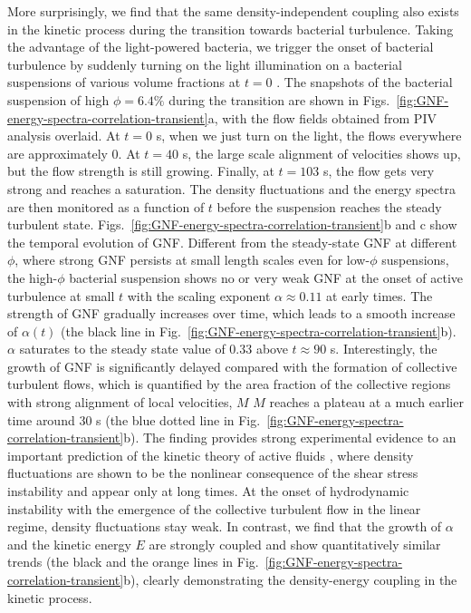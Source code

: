 \documentclass[twocolumn,aps,prx,amsmath,amssymb,longbibliography]{revtex4-2}
\begin{document}
More surprisingly, we find that the same density-independent coupling also exists in the kinetic process during the transition towards bacterial turbulence. Taking the advantage of the light-powered bacteria, we trigger the onset of bacterial turbulence by suddenly turning on the light illumination on a bacterial suspensions of various volume fractions at $t=0$ \cite{Peng2020}.
The snapshots of the bacterial suspension of high $\phi = 6.4\%$ during the transition are shown in Figs.~\ref{fig:GNF-energy-spectra-correlation-transient}a, with the flow fields obtained from PIV analysis overlaid. At $t=0$ s, when we just turn on the light, the flows everywhere are approximately 0. At $t=40$ s, the large scale alignment of velocities shows up, but the flow strength is still growing. Finally, at $t=103$ s, the flow gets very strong and reaches a saturation.
The density fluctuations and the energy spectra are then monitored as a function of $t$ before the suspension reaches the steady turbulent state. Figs.~\ref{fig:GNF-energy-spectra-correlation-transient}b and c show the temporal evolution of GNF. Different from the steady-state GNF at different $\phi$, where strong GNF persists at small length scales even for low-$\phi$ suspensions, the high-$\phi$ bacterial suspension shows no or very weak GNF at the onset of active turbulence at small $t$ with the scaling exponent $\alpha \approx 0.11$ at early times. The strength of GNF gradually increases over time, which leads to a smooth increase of $\alpha(t)$ (the black line in Fig.~\ref{fig:GNF-energy-spectra-correlation-transient}b). $\alpha$ saturates to the steady state value of 0.33 above $t \approx 90$ s. Interestingly, the growth of GNF is significantly delayed compared with the formation of collective turbulent flows, which is quantified by the area fraction of the collective regions with strong alignment of local velocities, $M$ \cite{Cisneros2011, Peng2020, Liu2020}
$M$ reaches a plateau at a much earlier time around 30 s (the blue dotted line in Fig.~\ref{fig:GNF-energy-spectra-correlation-transient}b). The finding provides strong experimental evidence to an important prediction of the kinetic theory of active fluids \cite{Saintillan2008a,Saintillan2008b}, where density fluctuations are shown to be the nonlinear consequence of the shear stress instability and appear only at long times. At the onset of hydrodynamic instability with the emergence of the collective turbulent flow in the linear regime, density fluctuations stay weak.
In contrast, we find that the growth of $\alpha$ and the kinetic energy $E$ are strongly coupled and show quantitatively similar trends (the black and the orange lines in Fig.~\ref{fig:GNF-energy-spectra-correlation-transient}b), clearly demonstrating the density-energy coupling in the kinetic process.
\end{document}
